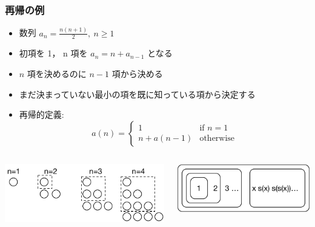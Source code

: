 \begin{frame}
\frametitle{再帰の例}
  \begin{itemize}
\item 数列 \(a_n=\frac{n(n+1)}{2},\ n\geq 1\)
\item 初項を 1， n 項を \(a_n=n+a_{n-1}\) となる
\item \(n\) 項を決めるのに \(n-1\) 項から決める
\item まだ決まっていない最小の項を既に知っている項から決定する
\item 再帰的定義:
\begin{displaymath}
a(n) = \left\{ \begin{array}{ll}
\displaystyle 1               & \mbox{if }n=1 \\
              n + a(n-1)    & \mbox{otherwise} 
\end{array} \right.
\end{displaymath}
  \end{itemize}
  \begin{columns}
    \begin{column}[t]{0.4\textwidth}
      \begin{center}
\vspace{-2em}
\includegraphics[scale=0.4]{./Figure/elementaryCS-figTriangular.pdf}
      \end{center}
    \end{column}
    \begin{column}[t]{0.4\textwidth}
      \begin{center}
\includegraphics[scale=0.4]{./Figure/elementaryCS-2nd-figRecursion.pdf}
      \end{center}
    \end{column}
  \end{columns}
\end{frame}
